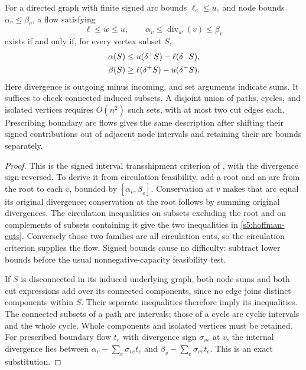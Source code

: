 \begin{lemma}\label{s5:cuts}
For a directed graph with finite signed arc bounds $\ell_e\le u_e$
and node bounds $\alpha_v\le\beta_v$, a flow satisfying
\[
 \ell\le w\le u,\qquad
 \alpha_v\le\operatorname{div}_w(v)\le\beta_v
\]
exists if and only if, for every vertex subset $S$,
\begin{align}
 \alpha(S)&\le u(\delta^+S)-\ell(\delta^-S),\notag\\
 \beta(S)&\ge \ell(\delta^+S)-u(\delta^-S).
 \label{s5:hoffman-cuts}
\end{align}
Here divergence is outgoing minus incoming, and set arguments indicate
sums. It suffices to check connected induced subsets. A disjoint union
of paths, cycles, and isolated vertices requires $O(n^2)$ such sets,
with at most two cut edges each. Prescribing boundary arc flows gives
the same description after shifting their signed contributions out of
adjacent node intervals and retaining their arc bounds separately.
\end{lemma}
\begin{proof}
This is the signed interval transshipment criterion of
\citet[Corollary~11.2i, p.~175]{s5:schrijver2003}, with the divergence
sign reversed. To derive it from circulation feasibility, add a root
and an arc from the root to each $v$, bounded by
$[\alpha_v,\beta_v]$. Conservation at $v$ makes that arc equal its
original divergence; conservation at the root follows by summing
original divergences. The circulation inequalities on subsets excluding
the root and on complements of subsets containing it give the two
inequalities in \eqref{s5:hoffman-cuts}. Conversely those two families
are all circulation cuts, so the circulation criterion supplies the
flow. Signed bounds cause no difficulty: subtract lower bounds before
the usual nonnegative-capacity feasibility test.

If $S$ is disconnected in its induced underlying graph, both node sums
and both cut expressions add over its connected components, since no
edge joins distinct components within $S$. Their separate inequalities
therefore imply its inequalities. The connected subsets of a path are
intervals; those of a cycle are cyclic intervals and the whole cycle.
Whole components and isolated vertices must be retained. For prescribed
boundary flow $t_e$ with divergence sign $\sigma_{ve}$ at $v$, the
internal divergence lies between
$\alpha_v-\sum_e\sigma_{ve}t_e$ and
$\beta_v-\sum_e\sigma_{ve}t_e$. This is an exact substitution.
\end{proof}

